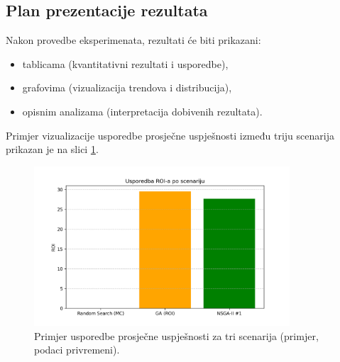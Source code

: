 \subsection{Plan prezentacije rezultata}
Nakon provedbe eksperimenata, rezultati će biti prikazani:
\begin{itemize}
    \item tablicama (kvantitativni rezultati i usporedbe),
    \item grafovima (vizualizacija trendova i distribucija),
    \item opisnim analizama (interpretacija dobivenih rezultata).
\end{itemize}

Primjer vizualizacije usporedbe prosječne uspješnosti između triju scenarija prikazan je na slici \ref{fig:usporedba_roi}.

\begin{figure}[H]
    \centering
    \includegraphics[width=0.85\textwidth]{slike/usporedba_roi.png}
    \caption{Primjer usporedbe prosječne uspješnosti za tri scenarija (primjer, podaci privremeni).}
    \label{fig:usporedba_roi}
\end{figure}
